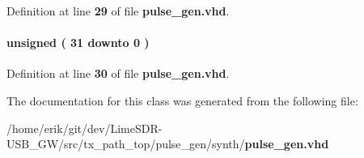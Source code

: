 Definition at line {\bf 29} of file {\bf pulse\+\_\+gen.\+vhd}.

\paragraph[{cnt\+\_\+max}]{ {\bfseries \textcolor{comment}{unsigned}\textcolor{vhdlchar}{ }\textcolor{vhdlchar}{(}\textcolor{vhdlchar}{ }\textcolor{vhdlchar}{ } \textcolor{vhdldigit}{31} \textcolor{vhdlchar}{ }\textcolor{keywordflow}{downto}\textcolor{vhdlchar}{ }\textcolor{vhdlchar}{ } \textcolor{vhdldigit}{0} \textcolor{vhdlchar}{ }\textcolor{vhdlchar}{)}\textcolor{vhdlchar}{ }} \hspace{0.3cm}{\ttfamily [Signal]}}\label{classpulse__gen_1_1arch_abda83f240713d2965a357d35c6a85f59}


Definition at line {\bf 30} of file {\bf pulse\+\_\+gen.\+vhd}.



The documentation for this class was generated from the following file\+:\begin{DoxyCompactItemize}
\item 
/home/erik/git/dev/\+Lime\+S\+D\+R-\/\+U\+S\+B\+\_\+\+G\+W/src/tx\+\_\+path\+\_\+top/pulse\+\_\+gen/synth/{\bf pulse\+\_\+gen.\+vhd}\end{DoxyCompactItemize}
